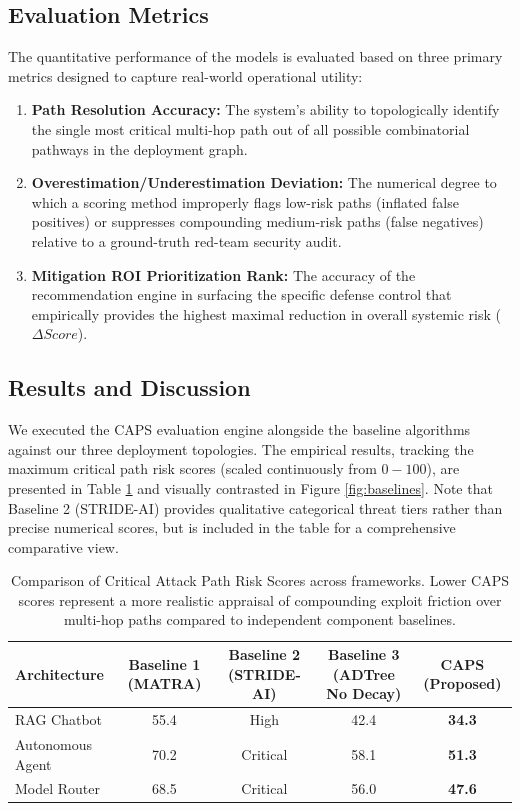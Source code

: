 \subsection{Evaluation Metrics}
The quantitative performance of the models is evaluated based on three primary metrics designed to capture real-world operational utility:
\begin{enumerate}
    \item \textbf{Path Resolution Accuracy:} The system's ability to topologically identify the single most critical multi-hop path out of all possible combinatorial pathways in the deployment graph.
    \item \textbf{Overestimation/Underestimation Deviation:} The numerical degree to which a scoring method improperly flags low-risk paths (inflated false positives) or suppresses compounding medium-risk paths (false negatives) relative to a ground-truth red-team security audit.
    \item \textbf{Mitigation ROI Prioritization Rank:} The accuracy of the recommendation engine in surfacing the specific defense control that empirically provides the highest maximal reduction in overall systemic risk ($\Delta Score$).
\end{enumerate}

\subsection{Results and Discussion}

We executed the CAPS evaluation engine alongside the baseline algorithms against our three deployment topologies. The empirical results, tracking the maximum critical path risk scores (scaled continuously from $0 - 100$), are presented in Table \ref{tab:results} and visually contrasted in Figure \ref{fig:baselines}. Note that Baseline 2 (STRIDE-AI) provides qualitative categorical threat tiers rather than precise numerical scores, but is included in the table for a comprehensive comparative view.

\begin{table}[ht]
\centering
\begin{tabular}{|l|c|c|c|c|}
\hline
\textbf{Architecture} & \textbf{Baseline 1 (MATRA)} & \textbf{Baseline 2 (STRIDE-AI)} & \textbf{Baseline 3 (ADTree No Decay)} & \textbf{CAPS (Proposed)} \\
\hline
RAG Chatbot & 55.4 & High & 42.4 & \textbf{34.3} \\
Autonomous Agent & 70.2 & Critical & 58.1 & \textbf{51.3} \\
Model Router & 68.5 & Critical & 56.0 & \textbf{47.6} \\
\hline
\end{tabular}
\caption{Comparison of Critical Attack Path Risk Scores across frameworks. Lower CAPS scores represent a more realistic appraisal of compounding exploit friction over multi-hop paths compared to independent component baselines.}
\label{tab:results}
\end{table}


